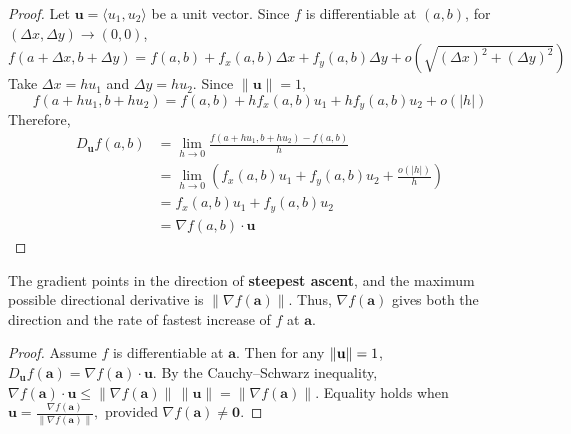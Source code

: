 \documentclass[oneside]{book}
\begin{document}
\begin{proof}
\noindent Let \(\mathbf u=\langle u_1,u_2\rangle\) be a unit vector. Since \(f\) is
differentiable at \((a,b)\), for \((\Delta x,\Delta y)\to(0,0)\),
\[
f(a+\Delta x,b+\Delta y)
=
f(a,b)+f_x(a,b)\Delta x+f_y(a,b)\Delta y
+o\!\left(\sqrt{(\Delta x)^2+(\Delta y)^2}\right)
\]
Take \(\Delta x=hu_1\) and \(\Delta y=hu_2\). Since \(\|\mathbf u\|=1\),
\[
f(a+hu_1,b+hu_2)
=
f(a,b)+h f_x(a,b)u_1+h f_y(a,b)u_2+o(|h|)
\]
Therefore,
\[
\begin{aligned}
D_{\mathbf u}f(a,b)
&=
\lim_{h\to 0}
\frac{f(a+hu_1,b+hu_2)-f(a,b)}{h} \\
&=
\lim_{h\to 0}
\left(
f_x(a,b)u_1+f_y(a,b)u_2+\frac{o(|h|)}{h}
\right) \\
&=
f_x(a,b)u_1+f_y(a,b)u_2 \\
&=
\nabla f(a,b)\cdot \mathbf u
\end{aligned}
\]
\end{proof}
\noindent The gradient points in the direction of \textbf{steepest ascent}, and the
maximum possible directional derivative is
$
    \|\nabla f(\mathbf a)\|.
$
Thus, \(\nabla f(\mathbf a)\) gives both the direction and the rate of fastest
increase of \(f\) at \(\mathbf a\).

\begin{proof}
\noindent Assume \(f\) is differentiable at \(\mathbf a\). Then for any $\left\lVert \mathbf{u} \right\rVert=1$,
$
    D_{\mathbf u}f(\mathbf a)
    =
    \nabla f(\mathbf a)\cdot \mathbf u.
$
By the Cauchy--Schwarz inequality,
$
    \nabla f(\mathbf a)\cdot \mathbf u
    \leq
    \|\nabla f(\mathbf a)\|\,\|\mathbf u\|
    =
    \|\nabla f(\mathbf a)\|.
$
Equality holds when
$
    \mathbf u
    =
    \frac{\nabla f(\mathbf a)}{\|\nabla f(\mathbf a)\|},
$
provided \(\nabla f(\mathbf a)\neq \mathbf 0\).
\end{proof}
\end{document}
